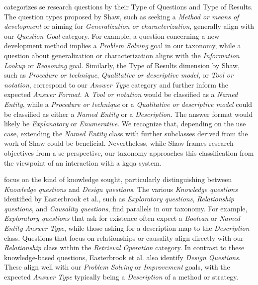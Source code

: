 \textcite{shaw_writing_2003} categorizes \gls{se} research questions by their Type of Questions and Type of Results. The question types proposed by Shaw, such as seeking a \emph{Method or means of development} or aiming for \emph{Generalization or characterization}, generally align with our \emph{Question Goal} category. For example, a question concerning a new development method implies a \emph{Problem Solving} goal in our taxonomy, while a question about generalization or characterization aligns with the \emph{Information Lookup} or \emph{Reasoning} goal. Similarly, the Type of Results dimension by Shaw, such as \emph{Procedure or technique}, \emph{Qualitative or descriptive model}, or \emph{Tool or notation}, correspond to our \emph{Answer Type} category and further inform the expected \emph{Answer Format}. A \emph{Tool or notation} would be classified as a \emph{Named Entity}, while a \emph{Procedure or technique} or a \emph{Qualitative or descriptive model} could be classified as either a \emph{Named Entity} or a \emph{Description}. The answer format would likely be \emph{Explanatory} or \emph{Enumerative}. We recognize that, depending on the use case, extending the \emph{Named Entity} class with further subclasses derived from the work of Shaw could be beneficial. Nevertheless, while Shaw frames research objectives from a \gls{se} perspective, our taxonomy approaches this classification from the viewpoint of an interaction with a \gls{kgqa} system.

\textcite{easterbrook_selecting_2008} focus on the kind of knowledge sought, particularly distinguishing between \emph{Knowledge questions} and \emph{Design questions}. The various \emph{Knowledge questions} identified by Easterbrook et al., such as \emph{Exploratory questions}, \emph{Relationship questions}, and \emph{Causality questions}, find parallels in our taxonomy. For example, \emph{Exploratory questions} that ask for existence often expect a \emph{Boolean} or \emph{Named Entity} \emph{Answer Type}, while those asking for a description map to the \emph{Description} class. Questions that focus on relationships or causality align directly with our \emph{Relationship} class within the \emph{Retrieval Operation} category. In contrast to these knowledge-based questions, Easterbrook et al. also identify \emph{Design Questions}. These align well with our \emph{Problem Solving} or \emph{Improvement} goals, with the expected \emph{Answer Type} typically being a \emph{Description} of a method or strategy.

